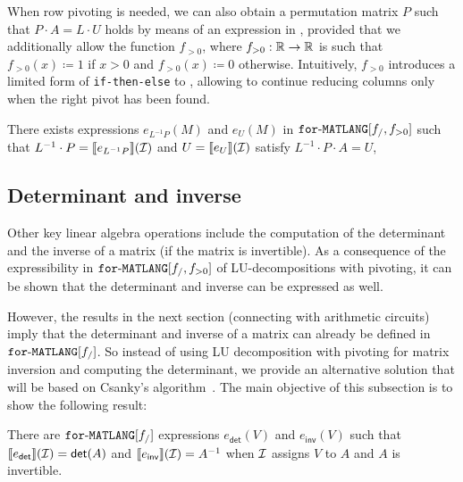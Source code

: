 When row pivoting is needed, we can also obtain a permutation matrix
$P$ such that $P\cdot A=L\cdot U$ holds by means of an expression in \langfor, provided
that we additionally allow the function $f_{>0}$, 
where $f_{>0}:\mathbb{R}\to\mathbb{R}$ is such that $f_{>0}(x)\coloneqq  1$ if $x>0$ and $f_{>0}(x)\coloneqq  0$ otherwise.
Intuitively, $f_{>0}$ introduces a limited form of \texttt{if-then-else} to \langfor, allowing to continue reducing columns only when the right pivot has been found.

\begin{proposition}\label{prop:palu}
There exists expressions $e_{L^{-1}P}(M)$ and $e_U(M)$ in $\texttt{for}\text{-}\texttt{MATLANG}[f_/,f_{>0}]$ such that
$L^{-1}\cdot P=\llbracket e_{L^{-1}P} \rrbracket(\mathcal{I})$ and $U=\llbracket e_U \rrbracket(\mathcal{I})$ satisfy $L^{-1}\cdot P\cdot A=U$,
\end{proposition}




\subsection{Determinant and inverse}\label{sec:queries:inverse}
Other key linear algebra operations include the computation of the determinant and
the inverse of a matrix (if the matrix is invertible). As a consequence of the expressibility
in $\texttt{for}\text{-}\texttt{MATLANG}[f_/,f_{>0}]$ of LU-decompositions with pivoting, it can be shown that the determinant
and inverse can be expressed as well. 

However, the results
in the next section (connecting \langfor with arithmetic circuits) imply that the determinant
and inverse of a matrix can already be defined in $\texttt{for}\text{-}\texttt{MATLANG}[f_/]$. So instead of using LU decomposition with pivoting for matrix inversion and computing the determinant, we provide an alternative solution that will be based on Csanky's algorithm~\cite{Csanky76}. The main objective of this subsection is to show the following result:

\begin{proposition}\label{prop:inverse}
    There are $\texttt{for}\text{-}\texttt{MATLANG}[f_/]$ expressions $e_{\mathsf{det}}(V)$ and $e_{\mathsf{inv}}(V)$ such that
    $\llbracket e_{\mathsf{det}} \rrbracket(\mathcal{I})=\mathsf{det}(A)$ and  
    $\llbracket e_{\mathsf{inv}} \rrbracket(\mathcal{I})=A^{-1}$ when $\mathcal{I}$ assigns $V$
    to $A$ and $A$ is invertible.
\end{proposition}

